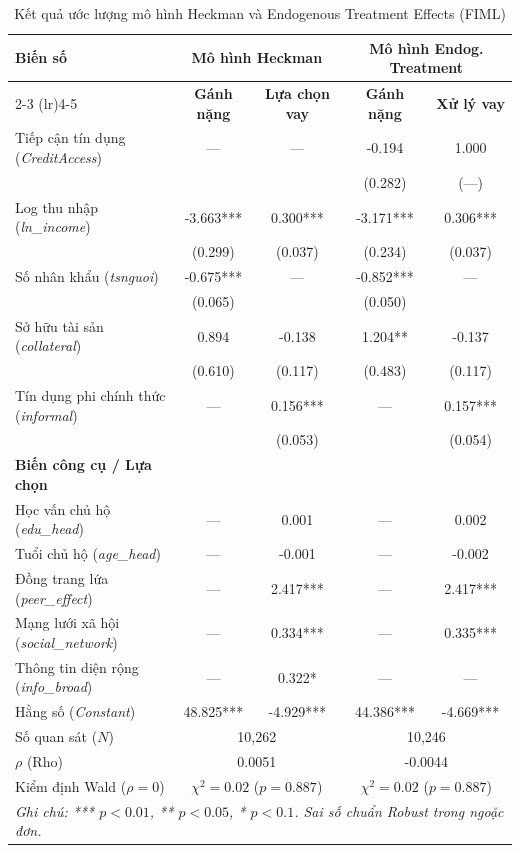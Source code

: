 \documentclass[12pt,a4paper]{report}
\begin{document}
\begin{table}[htbp]
	\centering
	\caption{Kết quả ước lượng mô hình Heckman và Endogenous Treatment Effects (FIML)}
	\label{tab:appendix_main_models}
	\small
	\begin{tabular}{lcccc}
		\toprule
		\multirow{2}{*}{\textbf{Biến số}} & \multicolumn{2}{c}{\textbf{Mô hình Heckman}} & \multicolumn{2}{c}{\textbf{Mô hình Endog. Treatment}} \\
		\cmidrule(lr){2-3} \cmidrule(lr){4-5}
		& \textbf{Gánh nặng} & \textbf{Lựa chọn vay} & \textbf{Gánh nặng} & \textbf{Xử lý vay} \\
		\midrule
		Tiếp cận tín dụng (\textit{CreditAccess}) & --- & --- & -0.194 & 1.000 \\
		& & & (0.282) & (---) \\
		Log thu nhập (\textit{ln\_income}) & -3.663*** & 0.300*** & -3.171*** & 0.306*** \\
		& (0.299) & (0.037) & (0.234) & (0.037) \\
		Số nhân khẩu (\textit{tsnguoi}) & -0.675*** & --- & -0.852*** & --- \\
		& (0.065) & & (0.050) & \\
		Sở hữu tài sản (\textit{collateral}) & 0.894 & -0.138 & 1.204** & -0.137 \\
		& (0.610) & (0.117) & (0.483) & (0.117) \\
		Tín dụng phi chính thức (\textit{informal}) & --- & 0.156*** & --- & 0.157*** \\
		& & (0.053) & & (0.054) \\
		\midrule
		\textbf{Biến công cụ / Lựa chọn} & & & & \\
		Học vấn chủ hộ (\textit{edu\_head}) & --- & 0.001 & --- & 0.002 \\
		Tuổi chủ hộ (\textit{age\_head}) & --- & -0.001 & --- & -0.002 \\
		Đồng trang lứa (\textit{peer\_effect}) & --- & 2.417*** & --- & 2.417*** \\
		Mạng lưới xã hội (\textit{social\_network}) & --- & 0.334*** & --- & 0.335*** \\
		Thông tin diện rộng (\textit{info\_broad}) & --- & 0.322* & --- & --- \\
		\midrule
		Hằng số (\textit{Constant}) & 48.825*** & -4.929*** & 44.386*** & -4.669*** \\
		\midrule
		Số quan sát ($N$) & \multicolumn{2}{c}{10,262} & \multicolumn{2}{c}{10,246} \\
		$\rho$ (Rho) & \multicolumn{2}{c}{0.0051} & \multicolumn{2}{c}{-0.0044} \\
		Kiểm định Wald ($\rho = 0$) & \multicolumn{2}{c}{$\chi^2 = 0.02$ ($p=0.887$)} & \multicolumn{2}{c}{$\chi^2 = 0.02$ ($p=0.887$)} \\
		\bottomrule
		\multicolumn{5}{l}{\footnotesize \textit{Ghi chú: *** $p<0.01$, ** $p<0.05$, * $p<0.1$. Sai số chuẩn Robust trong ngoặc đơn.}} \\
	\end{tabular}
\end{table}
\end{document}
